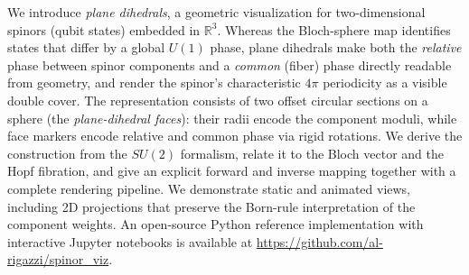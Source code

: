 We introduce \emph{plane dihedrals}, a geometric visualization for two-dimensional spinors (qubit
states) embedded in $\mathbb{R}^3$.
Whereas the Bloch-sphere map identifies states that differ by a global $U(1)$ phase, plane dihedrals
make both the \emph{relative} phase between spinor components and a \emph{common} (fiber) phase
directly readable from geometry, and render the spinor’s characteristic $4\pi$ periodicity as a
visible double cover.
The representation consists of two offset circular sections on a sphere
(the \emph{plane-dihedral faces}): their radii encode the component moduli, while face markers encode
relative and common phase via rigid rotations.
We derive the construction from the $SU(2)$ formalism, relate it to the Bloch vector and the Hopf
fibration, and give an explicit forward and inverse mapping together with a complete rendering
pipeline.
We demonstrate static and animated views, including 2D projections that preserve the Born-rule
interpretation of the component weights.
An open-source Python reference implementation with interactive Jupyter notebooks is available at
\url{https://github.com/al-rigazzi/spinor_viz}.
